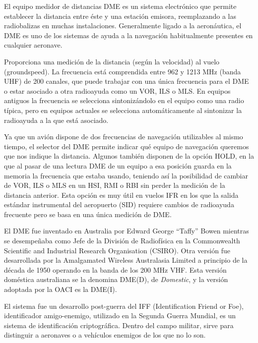 El equipo medidor de distancias %
\ac{DME}
 es un sistema electr\'onico que permite establecer la distancia entre \'este y una estaci\'on emisora, reemplazando a las radiobalizas en muchas instalaciones. Generalmente ligado a la aeron\'autica, el DME es uno de los sistemas de ayuda a la navegaci\'on habitualmente presentes en cualquier aeronave.

Proporciona una medici\'on de la distancia (seg\'un la velocidad) al vuelo (groundspeed). La frecuencia est\'a comprendida entre 962 y 1213 MHz (banda UHF) de 200 canales, que puede trabajar con una \'unica frecuencia para el DME o estar asociado a otra radioayuda como un VOR, ILS o MLS. En equipos antiguos la frecuencia se selecciona sintoniz\'andolo en el equipo como una radio t\'ipica, pero en equipos actuales se selecciona autom\'aticamente al sintonizar la radioayuda a la que est\'a asociado.

Ya que un avi\'on dispone de dos frecuencias de navegaci\'on utilizables al mismo tiempo, el selector del DME permite indicar qu\'e equipo de navegaci\'on queremos que nos indique la distancia. Algunos tambi\'en disponen de la opci\'on HOLD, en la que al pasar de una lectura DME de un equipo a esa posici\'on guarda en la memoria la frecuencia que estaba usando, teniendo as\'i la posibilidad de cambiar de VOR, ILS o MLS en un HSI, RMI o RBI sin perder la medici\'on de la distancia anterior. Esta opci\'on es muy \'util en vuelos IFR en los que la salida est\'andar instrumental del aeropuerto (SID) requiere cambios de radioayuda frecuente pero se basa en una \'unica medici\'on de DME.

El \ac{DME} fue inventado en Australia por  Edward George ``Taffy'' Bowen mientras se desempe\~naba como Jefe de la Divisi\'on de Radiof\'isica en la  Commonwealth Scientific and Industrial Research Organisation (CSIRO). Otra versi\'on fue desarrollada por la Amalgamated Wireless Australasia Limited a principio de la d\'ecada de 1950 operando en la banda de los 200 MHz VHF. Esta versi\'on dom\'estica australiana se la denomina DME(D), de \emph{Domestic}, y la versi\'on adoptada por la OACI es la DME(I).

El sistema fue un desarrollo post-guerra del IFF (Identification Friend or Foe), identificador amigo-enemigo, utilizado en la Segunda Guerra Mundial, es un sistema de identificaci\'on criptogr\'afica. Dentro del campo militar, sirve para distinguir a aeronaves o a veh\'iculos enemigos de los que no lo son.

